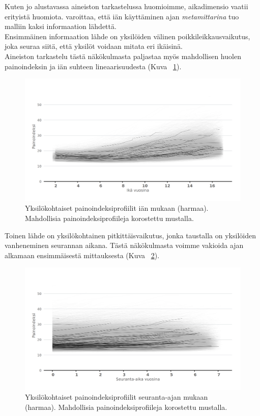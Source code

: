 \documentclass[finnish]{docopts}
\begin{document}
Kuten jo alustavassa aineiston tarkastelussa huomioimme, aikadimensio vaatii erityistä huomiota. \cite{fitzmaurice11} varoittaa, että iän käyttäminen ajan \textit{metamittarina} tuo malliin kaksi informaation lähdettä.\\

Ensimmäinen informaation lähde on yksilöiden välinen poikkileikkausvaikutus, joka seuraa siitä, että yksilöt voidaan mitata eri ikäisinä.\\

Aineiston tarkastelu tästä näkökulmasta paljastaa myös mahdollisen huolen painoindeksin ja iän suhteen lineaarisuudesta (Kuva ~\ref{fig:bmi_age}).\\

\begin{figure}[H]
\centering
  \includegraphics[scale=0.8]{kuvaajat/bmi_age.png}
  \caption{Yksilökohtaiset painoindeksiprofiilit iän mukaan (harmaa). Mahdollisia painoindeksiprofiileja korostettu mustalla.}
  \label{fig:bmi_age}
\end{figure}


Toinen lähde on yksilökohtainen pitkittäisvaikutus, jonka taustalla on yksilöiden vanheneminen seurannan aikana. Tästä näkökulmasta voimme vakioida ajan alkamaan ensimmäisestä mittauksesta (Kuva ~\ref{fig:bmi_follow}).\\

\begin{figure}[H]
\centering
  \includegraphics[scale=0.8]{kuvaajat/bmi_follow.png}
  \caption{Yksilökohtaiset painoindeksiprofiilit seuranta-ajan mukaan (harmaa). Mahdollisia painoindeksiprofiileja korostettu mustalla.}
  \label{fig:bmi_follow}
\end{figure}
\end{document}
